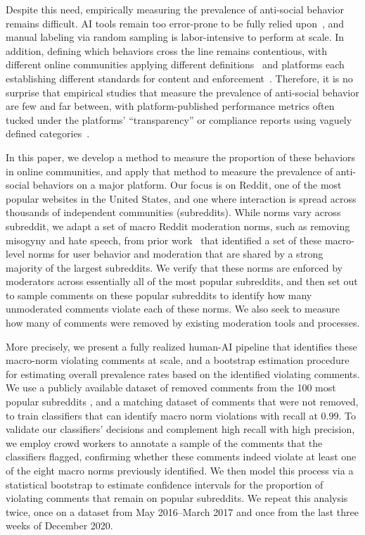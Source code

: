 Despite this need, empirically measuring the prevalence of anti-social behavior remains difficult. AI tools remain too error-prone to be fully relied upon~\cite{10_Binns, 11_Hosseini}, and manual labeling via random sampling is labor-intensive to perform at scale. In addition, defining which behaviors cross the line remains contentious, with different online communities applying different definitions~\cite{71_Laub} and platforms each establishing different standards for content and enforcement~\cite{71_Laub, 79_Klonick}. Therefore, it is no surprise that empirical studies that measure the prevalence of anti-social behavior are few and far between, with platform-published performance metrics often tucked under the platforms’ “transparency” or compliance reports using vaguely defined categories~\cite{58_Culliford}. 

In this paper, we develop a method to measure the proportion of these behaviors in online communities, and apply that method to measure the prevalence of anti-social behaviors on a major platform. Our focus is on Reddit, one of the most popular websites in the United States, and one where interaction is spread across thousands of independent communities (subreddits). While norms vary across subreddit, we adapt a set of macro Reddit moderation norms, such as removing misogyny and hate speech, from prior work~\cite{Chandrasekharan2018internet} that identified a set of these macro-level norms for user behavior and moderation that are shared by a strong majority of the largest subreddits. We verify that these norms are enforced by moderators across essentially all of the most popular subreddits, and then set out to sample comments on these popular subreddits to identify how many unmoderated comments violate each of these norms. We also seek to measure how many of comments were removed by existing moderation tools and processes.

More precisely, we present a fully realized human-AI pipeline that identifies these macro-norm violating comments at scale, and a bootstrap estimation procedure for estimating overall prevalence rates based on the identified violating comments. We use a publicly available dataset of removed comments from the 100 most popular subreddits  \cite{Chandrasekharan2018internet}, and a matching dataset of comments that were not removed, to train classifiers that can identify macro norm violations with recall at $0.99$. To validate our classifiers' decisions and complement high recall with high precision, we employ crowd workers to annotate a sample of the comments that the classifiers flagged, confirming whether these comments indeed violate at least one of the eight macro norms previously identified. We then model this process via a statistical bootstrap to estimate confidence intervals for the proportion of violating comments that remain on popular subreddits. We repeat this analysis twice, once on a dataset from May 2016--March 2017 and once from the last three weeks of December 2020.

